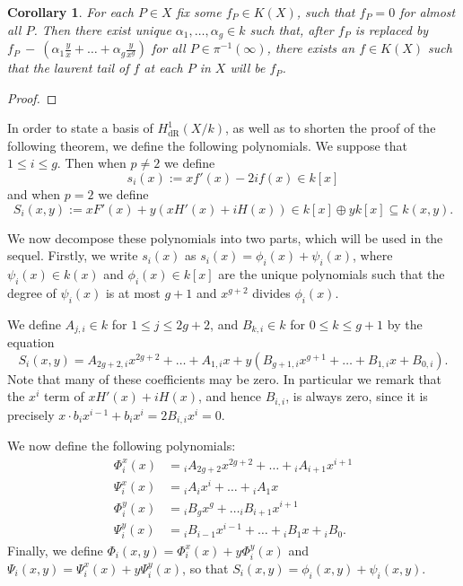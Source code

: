 \documentclass[draft, 11pt]{article} %
\theoremstyle{plain}
\newtheorem{cor}[defn]{Corollary}
\theoremstyle{remark}
\newcommand{\derhamhone}{H_{\text {dR}}^1(X/k)}
\begin{document}
\begin{cor}
For each $P \in X$ fix some $f_P \in K(X)$, such that $f_P = 0$ for almost all $P$.
Then there exist unique $\alpha_1, \ldots , \alpha_g \in k$ such that, after $f_P$ is replaced by $f_P~-~\left(\alpha_1 \frac{y}{x} + \ldots + \alpha_g \frac{y}{x^g} \right)$ for all $P \in \pi^{-1}(\infty)$, there exists an $f \in K(X)$ such that the laurent tail of $f$ at each $P$ in $X$ will be $f_P$.
\end{cor}
\begin{proof}

\end{proof}


In order to state a basis of $\derhamhone$, as well as to shorten the proof of the following theorem, we define the following polynomials. 
We suppose that $1 \leq i \leq g$.
Then when $p\neq 2$ we define
\[
s_i(x) := xf'(x) - 2if(x) \in k[x]
\]
and when $p = 2$ we define
\begin{equation}\label{capitals}
S_i(x,y) := xF'(x) + y(xH'(x) + iH(x))\in k[x]\oplus yk[x] \subseteq k(x,y).
\end{equation}

We now decompose these polynomials into two parts, which will be used in the sequel.
Firstly, we write $s_i(x)$ as $s_i(x) = \phi_i(x) + \psi_i(x)$, where $\psi_i(x)\in k(x)$ and $\phi_i(x) \in k[x]$ are the unique polynomials such that the degree of $\psi_i (x)$ is at most $g+1$ and $x^{g+2}$ divides $\phi_i(x)$.

We define $A_{j,i} \in k$ for $1 \leq j \leq 2g+2$, and $B_{k,i} \in k$ for $0\leq k \leq g+1$ by the equation
\[
S_i(x,y) = A_{2g+2,i}x^{2g+2} + \ldots + A_{1,i} x + y(B_{g+1,i} x^{g+1} + \ldots + B_{1,i} x + B_{0,i}).
\]
Note that many of these coefficients may be zero.
In particular we remark that the $x^i$ term of $xH'(x) + iH(x)$, and hence $B_{i,i}$, is always zero, since it is precisely $x \cdot b_ix^{i-1} + b_i x^i = 2B_{i,i}x^i = 0$.


We now define the following polynomials:
\begin{equation}\label{Split}
\begin{split}
\Phi_i^x(x) & =  {}_iA_{2g+2}x^{2g+2} + \ldots + {}_iA_{i+1}x^{i+1} \\
\Psi_i^x(x) & =  {}_iA_ix^i + \ldots + {}_iA_1x \\
\Phi_i^y(x) & =  {}_iB_gx^g + \ldots {}_iB_{i+1}x^{i+1} \\
\Psi_i^y(x) & =  {}_iB_{i-1}x^{i-1} + \ldots + {}_iB_1x + {}_iB_0.
\end{split}
\end{equation}
Finally, we define $\Phi_i(x,y) = \Phi_i^x(x) + y \Phi^y_i(x)$ and $\Psi_i(x,y) = \Psi_i^x(x) + y \Psi_i^y(x)$, so that $S_i(x,y) = \phi_i(x,y) + \psi_i(x,y)$.
\end{document}
